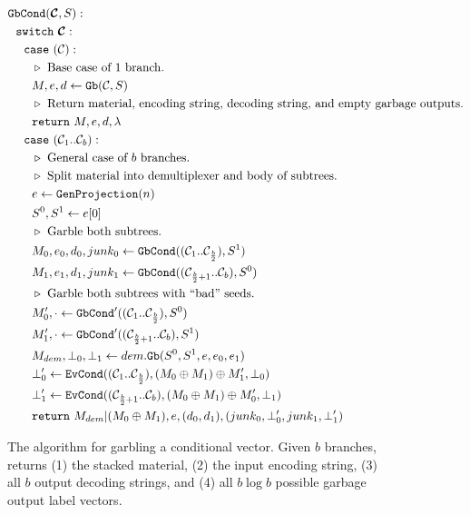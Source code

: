 \begin{figure}
  \begin{align*}
    &\gbcond(\vec{\cir}, S):\\
    &~~\switch~\vec{\cir}:\\
    &~~~~\ccase~(\cir):\\
    &~~~~~~\codecomment{Base case of $1$ branch.}\\
    &~~~~~~M, e, d \gets \gb(\cir, S)\\
    &~~~~~~\codecomment{Return material, encoding string, decoding string, and empty garbage outputs.}\\
    &~~~~~~\creturn~M, e, d, \lambda\\
    &~~~~\ccase~(\cir_1..\cir_b):\\
    &~~~~~~\codecomment{General case of $b$ branches.}\\
    &~~~~~~\codecomment{Split material into demultiplexer and body of subtrees.}\\
    &~~~~~~e \gets \genprojection(n)\\
    &~~~~~~S^0, S^1 \gets e[0]\\
    &~~~~~~\codecomment{Garble both subtrees.}\\
    &~~~~~~M_0,e_0,d_0,junk_0 \gets \gbcond((\cir_1..\cir_{\frac{b}{2}}), S^1)\\
    &~~~~~~M_1,e_1,d_1,junk_1 \gets \gbcond((\cir_{\frac{b}{2}+1}..\cir_b), S^0)\\
    &~~~~~~\codecomment{Garble both subtrees with ``bad'' seeds.}\\
    &~~~~~~M_0',\cdot \gets \gbcond'((\cir_1..\cir_{\frac{b}{2}}), S^0)\\
    &~~~~~~M_1',\cdot \gets \gbcond'((\cir_{\frac{b}{2}+1}..\cir_b), S^1)\\
    &~~~~~~M_{dem},\bot_0, \bot_1 \gets dem.\gb(S^0, S^1, e, e_0, e_1)\\
    &~~~~~~\bot_0' \gets \evcond((\cir_1..\cir_{\frac{b}{2}}), (M_0 \oplus M_1) \oplus M_1', \bot_0)\\
    &~~~~~~\bot_1' \gets \evcond((\cir_{\frac{b}{2}+1}..\cir_b), (M_0 \oplus M_1) \oplus M_0', \bot_1)\\
    &~~~~~~\creturn~M_{dem}|(M_0\oplus M_1), e, (d_0,d_1), (junk_0,\bot_0',junk_1,\bot_1')
  \end{align*}
  \caption{%
    The algorithm for garbling a conditional vector.
    Given $b$ branches, \gbcond returns (1) the stacked material, (2)
    the input encoding string, (3) all $b$ output decoding strings,
    and (4) all $b\log b$ possible garbage output label vectors.
  }
\end{figure}

